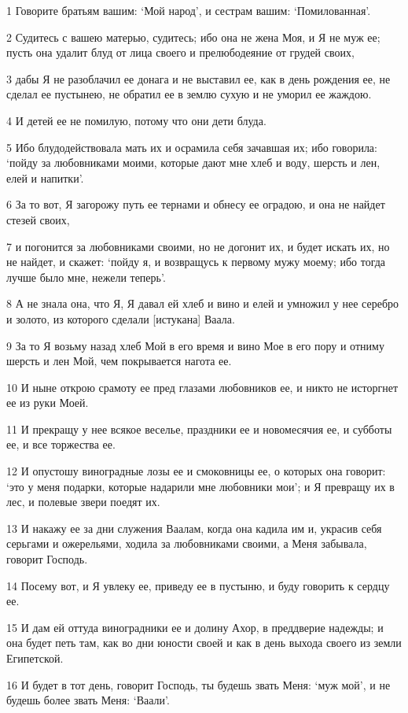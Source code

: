 \par 1 Говорите братьям вашим: `Мой народ', и сестрам вашим: `Помилованная'.
\par 2 Судитесь с вашею матерью, судитесь; ибо она не жена Моя, и Я не муж ее; пусть она удалит блуд от лица своего и прелюбодеяние от грудей своих,
\par 3 дабы Я не разоблачил ее донага и не выставил ее, как в день рождения ее, не сделал ее пустынею, не обратил ее в землю сухую и не уморил ее жаждою.
\par 4 И детей ее не помилую, потому что они дети блуда.
\par 5 Ибо блудодействовала мать их и осрамила себя зачавшая их; ибо говорила: `пойду за любовниками моими, которые дают мне хлеб и воду, шерсть и лен, елей и напитки'.
\par 6 За то вот, Я загорожу путь ее тернами и обнесу ее оградою, и она не найдет стезей своих,
\par 7 и погонится за любовниками своими, но не догонит их, и будет искать их, но не найдет, и скажет: `пойду я, и возвращусь к первому мужу моему; ибо тогда лучше было мне, нежели теперь'.
\par 8 А не знала она, что Я, Я давал ей хлеб и вино и елей и умножил у нее серебро и золото, из которого сделали [истукана] Ваала.
\par 9 За то Я возьму назад хлеб Мой в его время и вино Мое в его пору и отниму шерсть и лен Мой, чем покрывается нагота ее.
\par 10 И ныне открою срамоту ее пред глазами любовников ее, и никто не исторгнет ее из руки Моей.
\par 11 И прекращу у нее всякое веселье, праздники ее и новомесячия ее, и субботы ее, и все торжества ее.
\par 12 И опустошу виноградные лозы ее и смоковницы ее, о которых она говорит: `это у меня подарки, которые надарили мне любовники мои'; и Я превращу их в лес, и полевые звери поедят их.
\par 13 И накажу ее за дни служения Ваалам, когда она кадила им и, украсив себя серьгами и ожерельями, ходила за любовниками своими, а Меня забывала, говорит Господь.
\par 14 Посему вот, и Я увлеку ее, приведу ее в пустыню, и буду говорить к сердцу ее.
\par 15 И дам ей оттуда виноградники ее и долину Ахор, в преддверие надежды; и она будет петь там, как во дни юности своей и как в день выхода своего из земли Египетской.
\par 16 И будет в тот день, говорит Господь, ты будешь звать Меня: `муж мой', и не будешь более звать Меня: `Ваали'.
